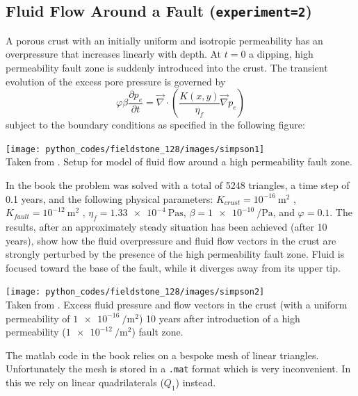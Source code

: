 \subsection*{Fluid Flow Around a Fault ({\tt experiment=2})}

A porous crust with an initially uniform and isotropic permeability has an
overpressure that increases linearly with depth. At $t=0$ a dipping, high permeability fault zone is
suddenly introduced into the crust.
The transient evolution of the excess pore pressure is governed by
\begin{equation}
\varphi \beta  \frac{\partial p_e}{\partial t}
=
\vec\nabla \cdot \left( \frac{K(x,y)}{\eta_f} \vec\nabla p_e  \right) 
\end{equation}
subject to the boundary conditions as specified in the following figure:
\begin{center}
\texttt{[image: python\_codes/fieldstone\_128/images/simpson1]}\\
{\captionfont Taken from \cite{simp17}. Setup for model of fluid flow around a high permeability fault zone.}
\end{center}

In the book the problem was solved with a total of 5248 triangles, 
a time step of 0.1 years, and the following physical parameters:
$K_{crust}=10^{-16}~\si{\square\meter}$ , 
$K_{fault}=10^{-12}~\si{\square\meter}$ , 
$\eta_f  = \SI{1.33e-4}{\pascal\second}$, 
$\beta=\SI{1e-10}{\per\pascal}$, and $\varphi=0.1$. 
The results, after an approximately steady situation has been achieved (after 10 years), show how the fluid overpressure
and fluid flow vectors in the crust are strongly perturbed by the presence of the high permeability
fault zone. Fluid is focused toward the base of the fault, while it diverges away from its upper tip.
\begin{center}
\texttt{[image: python\_codes/fieldstone\_128/images/simpson2]}\\
{\captionfont Taken from \cite{simp17}. Excess fluid pressure and flow vectors in the crust 
(with a uniform permeability of $\SI{1e-16}{\per\square\meter}$) 10 years after
introduction of a high permeability ($\SI{1e-12}{\per\square\meter}$) fault zone.}
\end{center}

The matlab code in the book relies on a bespoke mesh of linear triangles. Unfortunately the 
mesh is stored in a {\tt .mat} format which is very inconvenient. In this \stone we rely on 
linear quadrilaterals ($Q_1$) instead. 

